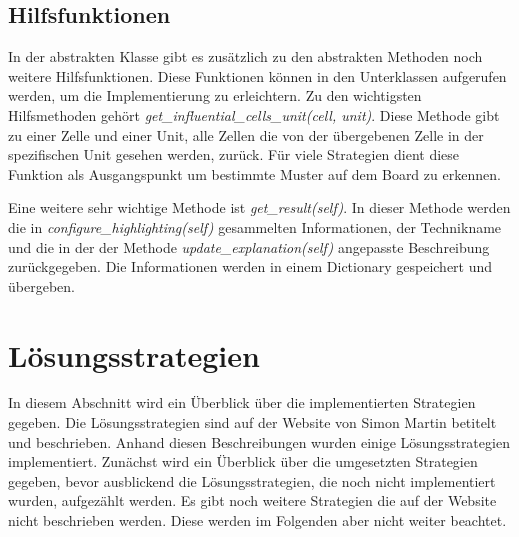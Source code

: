 \subsection{Hilfsfunktionen}

In der abstrakten Klasse gibt es zusätzlich zu den abstrakten Methoden noch weitere Hilfsfunktionen. Diese Funktionen können in den Unterklassen aufgerufen werden, um die Implementierung zu erleichtern. Zu den wichtigsten Hilfsmethoden gehört \textit{get\_influential\_cells\_unit(cell, unit)}. Diese Methode gibt zu einer Zelle und einer Unit, alle Zellen die von der übergebenen Zelle in der spezifischen Unit gesehen werden, zurück. Für viele Strategien dient diese Funktion als Ausgangspunkt um bestimmte Muster auf dem Board zu erkennen.

Eine weitere sehr wichtige Methode ist \textit{get\_result(self)}. In dieser Methode werden die in \textit{configure\_highlighting(self)} gesammelten Informationen, der Technikname und die in der der Methode \textit{update\_explanation(self)} angepasste Beschreibung zurückgegeben. Die Informationen werden in einem Dictionary gespeichert und übergeben. 

\section{Lösungsstrategien}

In diesem Abschnitt wird ein Überblick über die implementierten Strategien gegeben. Die Lösungsstrategien sind auf der Website von Simon Martin \cite{martin} betitelt und beschrieben. Anhand diesen Beschreibungen wurden einige Lösungsstrategien implementiert. Zunächst wird ein Überblick über die umgesetzten Strategien gegeben, bevor ausblickend die Lösungsstrategien, die noch nicht implementiert wurden, aufgezählt werden. Es gibt noch weitere Strategien die auf der Website nicht beschrieben werden. Diese werden im Folgenden aber nicht weiter beachtet.

